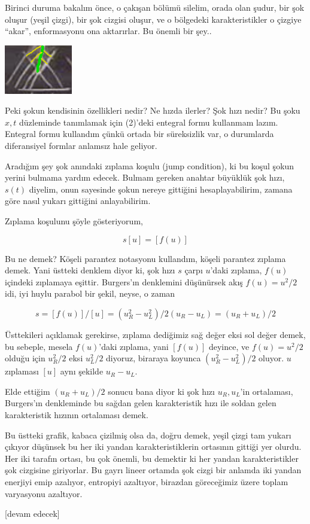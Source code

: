 \documentclass[12pt,fleqn]{article}\usepackage{../../common}
\begin{document}
Birinci duruma bakalım önce, o çakışan bölümü silelim, orada olan şudur,
bir şok oluşur (yeşil çizgi), bir şok cizgisi oluşur, ve o bölgedeki
karakteristikler o çizgiye ``akar'', enformasyonu ona aktarırlar. Bu
önemli bir şey..

\includegraphics[width=8em]{compscieng_2_09_02.png}

Peki şokun kendisinin özellikleri nedir? Ne hızda ilerler? Şok hızı nedir?  Bu
şoku $x,t$ düzleminde tanımlamak için (2)'deki entegral formu kullanmam lazım.
Entegral formu kullandım çünkü ortada bir süreksizlik var, o durumlarda
diferansiyel formlar anlamsız hale geliyor.

Aradığım şey şok anındaki zıplama koşulu (jump condition), ki bu koşul şokun
yerini bulmama yardım edecek. Bulmam gereken anahtar büyüklük şok hızı, $s(t)$
diyelim, onun sayesinde şokun nereye gittiğini hesaplayabilirim, zamana göre
nasıl yukarı gittiğini anlayabilirim.

Zıplama koşulunu şöyle gösteriyorum,

$$
s [u] = [f(u)]
$$

Bu ne demek? Köşeli parantez notasyonu kullandım, köşeli parantez zıplama
demek. Yani üstteki denklem diyor ki, şok hızı $s$ çarpı $u$'daki zıplama,
$f(u)$ içindeki zıplamaya eşittir.  Burgers'ın denklemini düşünürsek akış
$f(u) = u^2/2$ idi, iyi huylu parabol bir şekil, neyse, o zaman

$$
s = [f(u)]/[u] = (u_R^2 - u_L^2) / 2 (u_R-u_L) = (u_R + u_L) / 2
$$

Üsttekileri açıklamak gerekirse, zıplama dediğimiz sağ değer eksi sol değer
demek, bu sebeple, mesela $f(u)$'daki zıplama, yani $[f(u)]$ deyince, ve
$f(u) = u^2/2$ olduğu için $u_R^2/2$ eksi $u_L^2/2$ diyoruz, biraraya koyunca
$(u_R^2 - u_L^2) / 2$ oluyor. $u$ zıplaması $[u]$ aynı şekilde $u_R - u_L$. 

Elde ettiğim $(u_R + u_L) / 2$ sonucu bana diyor ki şok hızı $u_R,u_L$'in
ortalaması, Burgers'ın denkleminde bu sağdan gelen karakteristik hızı
ile soldan gelen karakteristik hızının ortalaması demek.

Bu üstteki grafik, kabaca çizilmiş olsa da, doğru demek, yeşil çizgi tam yukarı
çıkıyor düşünsek bu her iki yandan karakteristiklerin ortasının gittiği yer
olurdu. Her iki tarafın ortası, bu çok önemli, bu demektir ki her yandan
karakteristikler şok cizgisine giriyorlar. Bu gayrı lineer ortamda şok cizgi
bir anlamda iki yandan enerjiyi emip azalıyor, entropiyi azaltıyor, birazdan
göreceğimiz üzere toplam varyasyonu azaltıyor. 









[devam edecek]
\end{document}
